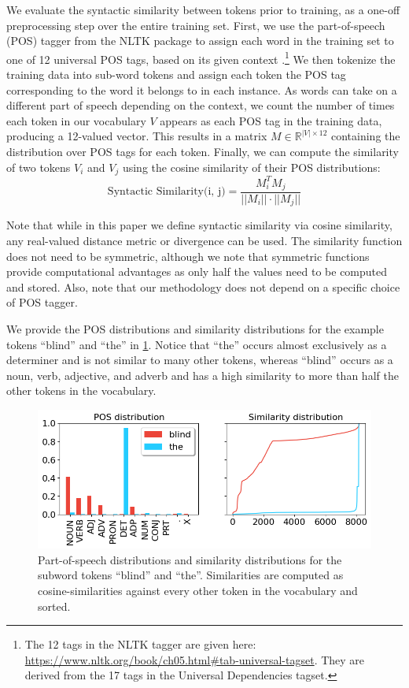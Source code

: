 We evaluate the syntactic similarity between tokens prior to training, as a one-off preprocessing step over the entire training set. First, we use the part-of-speech (POS) tagger from the NLTK package \citep{bird2009natural} to assign each word in the training set to one of 12 universal POS tags, based on its given context \citep{petrov2012universalpos}.\footnote{The 12 tags in the NLTK tagger are given here: \url{https://www.nltk.org/book/ch05.html\#tab-universal-tagset}. They are derived from the 17 tags in the Universal Dependencies tagset.} We then tokenize the training data into sub-word tokens and assign each token the POS tag corresponding to the word it belongs to in each instance. As words can take on a different part of speech depending on the context, we count the number of times each token in our vocabulary $V$ appears as each POS tag in the training data, producing a 12-valued vector. This results in a matrix $M \in \mathbb{R}^{|V|\times 12}$ containing the distribution over POS tags for each token. Finally, we can compute the similarity of two tokens $V_i$ and $V_j$ using the cosine similarity of their POS distributions: $$ \text{Syntactic Similarity(i, j)} = \frac{M_i^TM_j}{||M_i|| \cdot ||M_j||}$$ 


Note that while in this paper we define syntactic similarity via cosine similarity, any real-valued distance metric or divergence can be used. The similarity function does not need to be symmetric, although we note that symmetric functions provide computational advantages as only half the values need to be computed and stored. Also, note that our methodology does not depend on a specific choice of POS tagger.

We provide the POS distributions and similarity distributions for the example tokens ``blind'' and ``the'' in \cref{fig:distributions}. Notice that ``the'' occurs almost exclusively as a determiner and is not similar to many other tokens, whereas ``blind'' occurs as a noun, verb, adjective, and adverb and has a high similarity to more than half the other tokens in the vocabulary.

\begin{figure}[ht!]
    \centering
    \includegraphics[width=0.8\linewidth]{chapters/syntatic-smoothing/figures/distributions.png}
    \caption{Part-of-speech distributions and similarity distributions for the subword tokens ``blind'' and ``the''. Similarities are computed as cosine-similarities against every other token in the vocabulary and sorted.}
    \label{fig:distributions}
    \vspace{-1em}
\end{figure}

